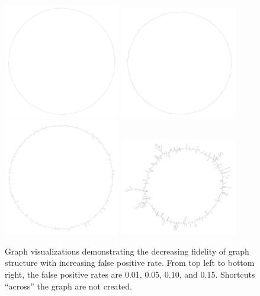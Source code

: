 \documentclass{pnastwo}
\begin{document}
\begin{figure}
\includegraphics[width=2in]{f3b001}
\includegraphics[width=2in]{f3b005}
\includegraphics[width=2in]{f3b010}
\includegraphics[width=2in]{f3b015}

\caption{Graph visualizations demonstrating the decreasing fidelity of
  graph structure with increasing false positive rate. From top left
  to bottom right, the false positive rates are 0.01, 0.05, 0.10, and
  0.15.  Shortcuts ``across'' the graph are not created.}

\label{fig:circles}
\end{figure}
\end{document}
